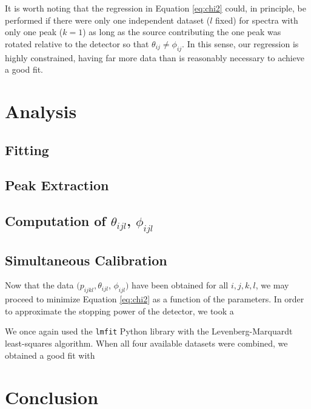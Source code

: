 \documentclass[11pt]{article}
\newcommand{\eqrefn}[1]{Equation \ref{eq:#1}}
\begin{document}
\begin{multicols}{2}
It is worth noting that the regression in \eqrefn{chi2} could, in principle, be performed if there were only one independent dataset ($l$ fixed) for spectra with only one peak ($k=1$) as long as the source contributing the one peak was rotated relative to the detector so that $\theta_{ij} \neq \phi_{ij} $. In this sense, our regression is highly constrained, having far more data than is reasonably necessary to achieve a good fit.





\section{Analysis}



\subsection{Fitting} 



\subsection{Peak Extraction}



\subsection{Computation of $\theta_{ijl}$, $\phi_{ijl}$}



\subsection{Simultaneous Calibration}

Now that the data $ ( p_{ijkl}, \theta_{ijl}$, $\phi_{ijl} ) $ have been obtained for all $i,j,k,l$, we may proceed to minimize \eqrefn{chi2} as a function of the parameters. In order to approximate the stopping power of the detector, we took a 

We once again used the \texttt{lmfit} Python library with the Levenberg-Marquardt least-squares algorithm.\cite{lmfit} When all four available datasets were combined, we obtained a good fit with


\section{Conclusion}







\end{multicols}
\end{document}
